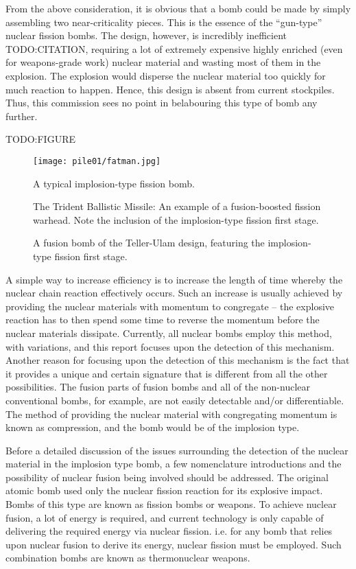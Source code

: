 \documentclass[twoside,titlepage,11pt,twocolumn,a4paper]{article}
\begin{document}
From the above consideration, it is obvious that a bomb could be made
by simply assembling two near-criticality pieces. This is the essence
of the ``gun-type'' nuclear fission bombs. The design, however, is
incredibly inefficient TODO:CITATION, requiring a lot of extremely
expensive highly enriched (even for weapons-grade work) nuclear
material and wasting most of them in the explosion. The explosion
would disperse the nuclear material too quickly for much reaction to
happen. Hence, this design is absent from current stockpiles. Thus,
this commission sees no point in belabouring this type of bomb any
further.

TODO:FIGURE
\begin{figure}
  \texttt{[image: pile01/fatman.jpg]}
  \caption{A typical implosion-type fission
    bomb. \citep{fatManAtomicArchive}}
\end{figure}
\begin{figure}
  \caption{The Trident Ballistic Missile: An example of a
    fusion-boosted fission warhead. Note the inclusion of the
    implosion-type fission first stage. }
\end{figure}
\begin{figure}
  \caption{A fusion bomb of the Teller-Ulam design, featuring the
    implosion-type fission first stage. }
\end{figure}

A simple way to increase efficiency is to increase the length of time
whereby the nuclear chain reaction effectively occurs. Such an
increase is usually achieved by providing the nuclear materials with
momentum to congregate -- the explosive reaction has to then spend
some time to reverse the momentum before the nuclear materials
dissipate. Currently, all nuclear bombs employ this method, with
variations, and this report focuses upon the detection of this
mechanism. Another reason for focusing upon the detection of this
mechanism is the fact that it provides a unique and certain signature
that is different from all the other possibilities. The fusion parts
of fusion bombs and all of the non-nuclear conventional bombs, for
example, are not easily detectable and/or differentiable. The method
of providing the nuclear material with congregating momentum is known
as compression, and the bomb would be of the implosion type.

Before a detailed discussion of the issues surrounding the detection
of the nuclear material in the implosion type bomb, a few
nomenclature introductions and the possibility of nuclear fusion being
involved should be addressed. The original atomic bomb used only the
nuclear fission reaction for its explosive impact. Bombs of this type
are known as fission bombs or weapons. To achieve nuclear fusion, a
lot of energy is required, and current technology is only capable of
delivering the required energy via nuclear fission. i.e. for any bomb
that relies upon nuclear fusion to derive its energy, nuclear fission
must be employed. Such combination bombs are known as thermonuclear
weapons.
\end{document}
